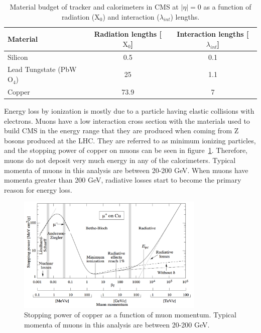 \begin{table}[htb]                                                                                                                                                              
  \begin{center}
    \caption{
      \label{tab:materialbudget}
      Material budget of tracker and calorimeters in CMS at $|\eta|=0$ as a function of radiation ($\mathrm{X_{0}}$) and interaction ($\lambda_{int}$) lengths.
    }
    \begin{tabular}{l|c|c}
      \hline
      \hline
      Material & Radiation lengths [$\mathrm{X_{0}}$] & Interaction lengths [$\lambda_{int}$]  \\
      \hline
      Silicon                             & 0.5 & 0.1 \\
      Lead Tungstate (PbW$\mathrm{O_{4}}$) & 25 & 1.1 \\
      Copper                              & 73.9 & 7 \\
      \hline
      \hline
    \end{tabular}
  \end{center}
\end{table}

Energy loss by ionization is mostly due to a particle having elastic collisions with electrons.
Muons have a low interaction cross section with the materials used to build CMS in the energy range that they are produced when coming from Z bosons produced at the LHC.
They are referred to as minimum ionizing particles, and the stopping power of copper on muons can be seen in figure~\ref{fig:muonenergyloss}.
Therefore, muons do not deposit very much energy in any of the calorimeters.
Typical momenta of muons in this analysis are between 20-200 GeV.
When muons have momenta greater than 200 GeV, radiative losses start to become the primary reason for energy loss.

\begin{figure}[!htb]
  \begin{center}
    \includegraphics[width=0.8\textwidth]{cms/figs/muon_energy_loss.pdf}
    \caption{
      \label{fig:muonenergyloss}
      Stopping power of copper as a function of muon momentum. Typical momenta of muons in this analysis are between 20-200 GeV.
    }
  \end{center}
\end{figure}


